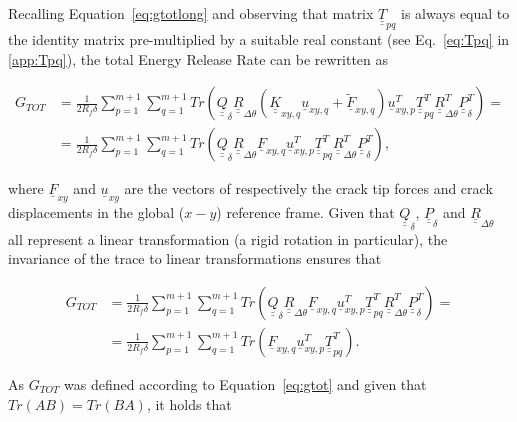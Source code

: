 \documentclass[review]{elsarticle}
\begin{document}
Recalling Equation~\ref{eq:gtotlong} and observing that matrix $\underline{\underline{T}}_{pq}$ is always equal to the identity matrix pre-multiplied by a suitable real constant (see Eq.~\ref{eq:Tpq} in \ref{app:Tpq}), the total Energy Release Rate can be rewritten as

\begin{equation}\label{eq:gtotlong1}
\begin{split}
G_{TOT}&=\frac{1}{2R_{f}\delta}\sum_{p=1}^{m+1}\sum_{q=1}^{m+1}Tr\left(\underline{\underline{Q}}_{\delta}\underline{\underline{R}}_{\Delta\theta}\left(\underline{\underline{K}}_{xy,q}\underline{u}_{xy,q}+\underline{\widetilde{F}}_{xy,q}\right)\underline{u}_{xy,p}^{T}\underline{\underline{T}}_{pq}^{T}\underline{\underline{R}}_{\Delta\theta}^{T}\underline{\underline{P}}_{\delta}^{T}\right)=\\
&=\frac{1}{2R_{f}\delta}\sum_{p=1}^{m+1}\sum_{q=1}^{m+1}Tr\left(\underline{\underline{Q}}_{\delta}\underline{\underline{R}}_{\Delta\theta}\underline{F}_{xy,q}\underline{u}_{xy,p}^{T}\underline{\underline{T}}_{pq}^{T}\underline{\underline{R}}_{\Delta\theta}^{T}\underline{\underline{P}}_{\delta}^{T}\right),
\end{split}
\end{equation}

where $\underline{F}_{xy}$ and $\underline{u}_{xy}$ are the vectors of respectively the crack tip forces and crack displacements in the global ($x-y$) reference frame. Given that $\underline{\underline{Q}}_{\delta}$, $\underline{\underline{P}}_{\delta}$ and $\underline{\underline{R}}_{\Delta\theta}$ all represent a linear transformation (a rigid rotation in particular), the invariance of the trace to linear transformations ensures that

\begin{equation}\label{eq:gtotlong2}
\begin{split}
G_{TOT}&=\frac{1}{2R_{f}\delta}\sum_{p=1}^{m+1}\sum_{q=1}^{m+1}Tr\left(\underline{\underline{Q}}_{\delta}\underline{\underline{R}}_{\Delta\theta}\underline{F}_{xy,q}\underline{u}_{xy,p}^{T}\underline{\underline{T}}_{pq}^{T}\underline{\underline{R}}_{\Delta\theta}^{T}\underline{\underline{P}}_{\delta}^{T}\right)=\\
&=\frac{1}{2R_{f}\delta}\sum_{p=1}^{m+1}\sum_{q=1}^{m+1}Tr\left(\underline{F}_{xy,q}\underline{u}_{xy,p}^{T}\underline{\underline{T}}_{pq}^{T}\right).
\end{split}
\end{equation}

As $G_{TOT}$ was defined according to Equation~\ref{eq:gtot} and given that $Tr\left(AB\right)=Tr\left(BA\right)$, it holds that 
\end{document}
